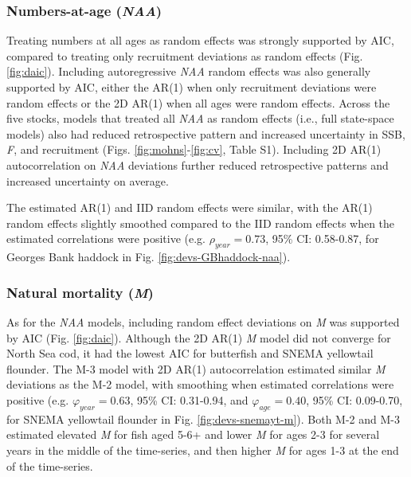 \documentclass[]{article}
\begin{document}
\hypertarget{numbers-at-age-naa-1}{%
\subsubsection{\texorpdfstring{Numbers-at-age
(\emph{NAA})}{Numbers-at-age (NAA)}}\label{numbers-at-age-naa-1}}

Treating numbers at all ages as random effects was strongly supported by
AIC, compared to treating only recruitment deviations as random effects
(Fig. \ref{fig:daic}). Including autoregressive \emph{NAA} random
effects was also generally supported by AIC, either the AR(1) when only
recruitment deviations were random effects or the 2D AR(1) when all ages
were random effects. Across the five stocks, models that treated all
\emph{NAA} as random effects (i.e., full state-space models) also had
reduced retrospective pattern and increased uncertainty in SSB,
\emph{F}, and recruitment (Figs. \ref{fig:mohns}-\ref{fig:cv}, Table
S1). Including 2D AR(1) autocorrelation on \emph{NAA} deviations further
reduced retrospective patterns and increased uncertainty on average.

The estimated AR(1) and IID random effects were similar, with the AR(1)
random effects slightly smoothed compared to the IID random effects when
the estimated correlations were positive (e.g. \(\rho_{year} = 0.73\),
95\% CI: 0.58-0.87, for Georges Bank haddock in Fig.
\ref{fig:devs-GBhaddock-naa}).

\hypertarget{natural-mortality-m-1}{%
\subsubsection{\texorpdfstring{Natural mortality
(\emph{M})}{Natural mortality (M)}}\label{natural-mortality-m-1}}

As for the \emph{NAA} models, including random effect deviations on
\emph{M} was supported by AIC (Fig. \ref{fig:daic}). Although the 2D
AR(1) \emph{M} model did not converge for North Sea cod, it had the
lowest AIC for butterfish and SNEMA yellowtail flounder. The M-3 model
with 2D AR(1) autocorrelation estimated similar \emph{M} deviations as
the M-2 model, with smoothing when estimated correlations were positive
(e.g. \(\varphi_{year} = 0.63\), 95\% CI: 0.31-0.94, and
\(\varphi_{age} = 0.40\), 95\% CI: 0.09-0.70, for SNEMA yellowtail
flounder in Fig. \ref{fig:devs-snemayt-m}). Both M-2 and M-3 estimated
elevated \emph{M} for fish aged 5-6+ and lower \emph{M} for ages 2-3 for
several years in the middle of the time-series, and then higher \emph{M}
for ages 1-3 at the end of the time-series.
\end{document}
